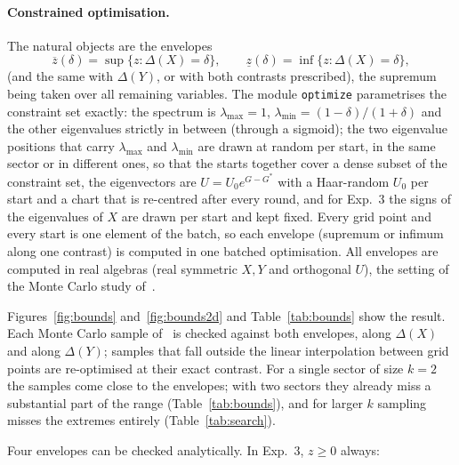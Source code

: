 \documentclass[11pt]{article}
\begin{document}
\paragraph{Constrained optimisation.} The natural objects are the envelopes
\[
  \overline z(\delta)=\sup\{z:\Delta(X)=\delta\},\qquad \underline z(\delta)=\inf\{z:\Delta(X)=\delta\},
\]
(and the same with $\Delta(Y)$, or with both contrasts prescribed), the supremum being taken over all
remaining variables. The module \texttt{optimize} parametrises the constraint set exactly: the spectrum
is $\lambda_{\max}=1$, $\lambda_{\min}=(1-\delta)/(1+\delta)$ and the other eigenvalues strictly in between
(through a sigmoid); the two eigenvalue positions that carry $\lambda_{\max}$ and $\lambda_{\min}$ are drawn at
random per start, in the same sector or in different ones, so that the starts together cover a dense subset of
the constraint set, the eigenvectors are $U=U_0e^{G-G^*}$ with a Haar-random $U_0$ per start and a chart
that is re-centred after every round, and for Exp.~3 the signs of the eigenvalues of $X$ are drawn per
start and kept fixed. Every grid point and every start is one element of the batch, so each envelope (supremum
or infimum along one contrast) is computed in one batched optimisation. All envelopes are computed in real algebras
(real symmetric $X,Y$ and orthogonal $U$), the setting of the Monte Carlo study of~\cite{v1}.

Figures~\ref{fig:bounds} and~\ref{fig:bounds2d} and Table~\ref{tab:bounds} show the result. Each Monte
Carlo sample of~\cite{v1} is checked against both envelopes, along $\Delta(X)$ and along $\Delta(Y)$; samples that fall
outside the linear interpolation between grid points are re-optimised at their exact contrast.  For a single sector of size $k=2$ the samples come close
to the envelopes; with two sectors they already miss a substantial part of the range (Table~\ref{tab:bounds}), and
for larger $k$ sampling misses the extremes entirely (Table~\ref{tab:search}).

Four envelopes can be checked analytically. In Exp.~3, $z\ge0$ always:
\end{document}

